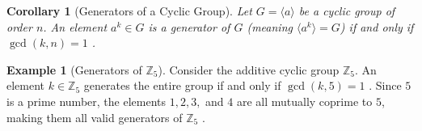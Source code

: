 \documentclass[11pt]{article}
\theoremstyle{definition}
\newtheorem{example}{Example}[section]
\theoremstyle{plain}
\newtheorem{corollary}{Corollary}[theorem]
\theoremstyle{remark}
\begin{document}
\begin{corollary}[Generators of a Cyclic Group]
Let $G = \langle a \rangle$ be a cyclic group of order $n$. An element $a^k \in G$ is a generator of $G$ (meaning $\langle a^k \rangle = G$) if and only if $\gcd(k, n) = 1$ \cite{dummit}.
\end{corollary}

\begin{example}[Generators of $\mathbb{Z}_5$]
Consider the additive cyclic group $\mathbb{Z}_5$. An element $k \in \mathbb{Z}_5$ generates the entire group if and only if $\gcd(k, 5) = 1$ \cite{fraleigh}. Since $5$ is a prime number, the elements $1, 2, 3,$ and $4$ are all mutually coprime to $5$, making them all valid generators of $\mathbb{Z}_5$ \cite{gallian}.
\end{example}
\end{document}
